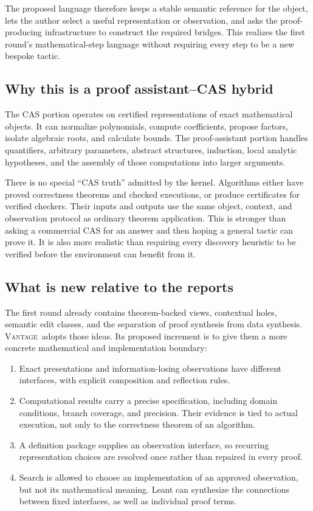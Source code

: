\documentclass[11pt,a4paper]{article}
\newcommand{\Vantage}{\textsc{Vantage}}
\theoremstyle{definition}
\begin{document}
The proposed language therefore keeps a stable semantic reference for the object,
lets the author select a useful representation or observation, and asks the
proof-producing infrastructure to construct the required bridges. This realizes
the first round's mathematical-step language without requiring every step to be
a new bespoke tactic.

\subsection{Why this is a proof assistant--CAS hybrid}
The CAS portion operates on certified representations of exact mathematical
objects. It can normalize polynomials, compute coefficients, propose factors,
isolate algebraic roots, and calculate bounds. The proof-assistant portion handles
quantifiers, arbitrary parameters, abstract structures, induction, local analytic
hypotheses, and the assembly of those computations into larger arguments.

There is no special ``CAS truth'' admitted by the kernel. Algorithms either have
proved correctness theorems and checked executions, or produce certificates for
verified checkers. Their inputs and outputs use the same object, context, and
observation protocol as ordinary theorem application. This is stronger than
asking a commercial CAS for an answer and then hoping a general tactic can prove
it. It is also more realistic than requiring every discovery heuristic to be
verified before the environment can benefit from it.

\subsection{What is new relative to the reports}
The first round already contains theorem-backed views, contextual holes,
semantic edit classes, and the separation of proof synthesis from data synthesis.
\Vantage\ adopts those ideas. Its proposed increment is to give them a more concrete
mathematical and implementation boundary:

\begin{enumerate}
\item Exact presentations and information-losing observations have different
  interfaces, with explicit composition and reflection rules.
\item Computational results carry a precise specification, including domain
  conditions, branch coverage, and precision. Their evidence is tied to actual
  execution, not only to the correctness theorem of an algorithm.
\item A definition package supplies an observation interface, so recurring
  representation choices are resolved once rather than repaired in every proof.
\item Search is allowed to choose an implementation of an approved observation,
  but not its mathematical meaning. Leant can synthesize the connections between
  fixed interfaces, as well as individual proof terms.
\end{enumerate}
\end{document}
